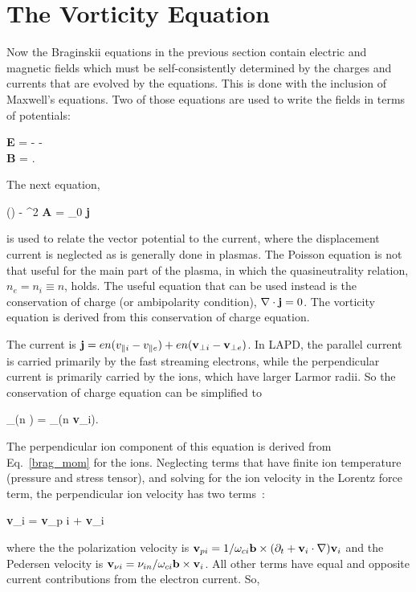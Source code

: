 \section{The Vorticity Equation}
\label{s_vorticity_eqn}

Now the Braginskii equations in the previous section contain electric and magnetic fields which must be self-consistently determined by the charges and currents that are evolved by the equations. 
This is done with the inclusion of Maxwell's equations. Two of those equations are used to write the fields in terms of potentials:

\beqar
\label{gauge}
{\bf E} = - \grad \phi -  \\ \nonumber
{\bf B} = \nabla {}.
\eeqar

The next equation,

\beq
\label{maxwell}
\grad(\grad {}) - \grad^2 {\bf A} = \mu_0 {\bf j}
\eeq

is used to relate the vector potential to the current, where the displacement current is neglected as is generally done in plasmas. The Poisson equation is not that useful for the main part
of the plasma, in which the quasineutrality relation, $n_e = n_i \equiv n$, holds. The useful equation that can be used instead is the conservation of charge (or ambipolarity condition), 
$\nabla \cdot {\bf j} = 0$. The vorticity equation is derived from this conservation of charge equation.

The current is ${\bf j} = e n (v_{\parallel i} - v_{\parallel e}) + e n ({\bf v}_{\perp i} - {\bf v}_{\perp e}) $. In LAPD, the parallel current is carried primarily by the fast streaming electrons, while the
perpendicular current is primarily carried by the ions, which have larger Larmor radii. So the conservation of charge equation can be simplified to

\beq
\label{simp_charge_cons}
\nabla_\para (n \vpe) = \nabla_\perp \cdot (n {\bf v}_{\perp i}).
\eeq

The perpendicular ion component of this equation is derived from Eq.~\ref{brag_mom} for the ions. Neglecting terms that have finite ion temperature (pressure and stress tensor), and solving
for the ion velocity in the Lorentz force term, the perpendicular ion velocity has two terms~\cite{Popovich2010a,simakov2003}:

\beq
\label{perp_ion_vel}
{\bf v}_{\perp i} = {\bf v}_{p i} + {\bf v}_{\nu i}
\eeq

where the the polarization velocity is ${\bf v}_{p i} = 1/\omega_{c i} {\bf b} \times (\partial_t + {\bf v}_i \cdot \nabla) {\bf v}_i$ and the Pedersen velocity is 
${\bf v}_{\nu i} = \nu_{in}/\omega_{c i} {\bf b} \times {\bf v}_i$. All other terms have equal and opposite current contributions from the electron current. So,

